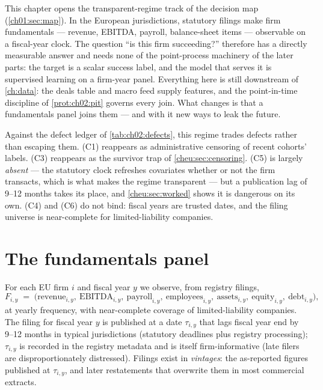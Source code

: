 
This chapter opens the transparent-regime track of the decision map (\cref{ch01:sec:map}). In
the European jurisdictions, statutory filings make firm fundamentals --- revenue, EBITDA,
payroll, balance-sheet items --- observable on a fiscal-year clock. The question ``is this firm
succeeding?'' therefore has a directly measurable answer and needs none of the point-process
machinery of the later parts: the target is a scalar success label, and the model that serves
it is supervised learning on a firm-year panel. Everything here is still downstream of
\cref{ch:data}: the deals table and macro feed supply features, and the point-in-time
discipline of \cref{prot:ch02:pit} governs every join. What changes is that a fundamentals
panel joins them --- and with it new ways to leak the future.

Against the defect ledger of \cref{tab:ch02:defects}, this regime trades defects rather than
escaping them. (C1) reappears as administrative censoring of recent cohorts' labels. (C3)
reappears as the survivor trap of \cref{cheu:sec:censoring}. (C5) is largely \emph{absent} ---
the statutory clock refreshes covariates whether or not the firm transacts, which is what makes
the regime transparent --- but a publication lag of 9--12 months takes its place, and
\cref{cheu:sec:worked} shows it is dangerous on its own. (C4) and (C6) do not bind: fiscal
years are trusted dates, and the filing universe is near-complete for limited-liability
companies.

\section{The fundamentals panel}\label{cheu:sec:panel}

For each EU firm $i$ and fiscal year $y$ we observe, from registry filings,
\begin{equation}\label{eq:success-panel}
F_{i,y} \;=\; \big(\text{revenue}_{i,y},\ \text{EBITDA}_{i,y},\
\text{payroll}_{i,y},\ \text{employees}_{i,y},\ \text{assets}_{i,y},\
\text{equity}_{i,y},\ \text{debt}_{i,y}\big),
\end{equation}
at yearly frequency, with near-complete coverage of limited-liability companies. The filing for
fiscal year $y$ is published at a date $\tau_{i,y}$ that lags fiscal year end by 9--12 months in
typical jurisdictions (statutory deadlines plus registry processing); $\tau_{i,y}$ is recorded
in the registry metadata and is itself firm-informative (late filers are disproportionately
distressed). Filings exist in \emph{vintages}: the as-reported figures published at
$\tau_{i,y}$, and later restatements that overwrite them in most commercial extracts.

